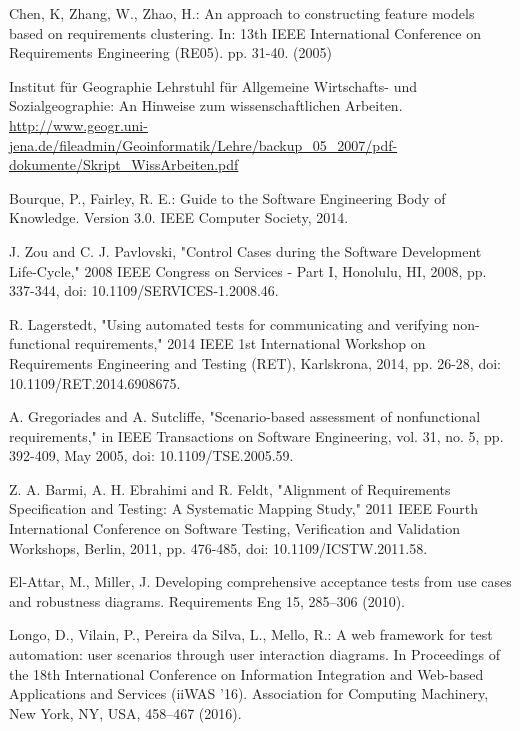 \documentclass[a4paper,10pt, bibliography=totocnumbered]{scrreprt}
\begin{document}
\begin{thebibliography}{9}

 Chen, K, Zhang, W., Zhao, H.: An approach to constructing feature models based on requirements clustering.
In: 13th IEEE International Conference on Requirements Engineering (RE05). pp. 31-40. (2005)

 Institut für Geographie   
Lehrstuhl für Allgemeine Wirtschafts- und Sozialgeographie: An Hinweise zum wissenschaftlichen Arbeiten.
\url{http://www.geogr.uni-jena.de/fileadmin/Geoinformatik/Lehre/backup_05_2007/pdf-dokumente/Skript_WissArbeiten.pdf}

 Bourque, P., Fairley, R. E.: Guide to the Software Engineering Body of Knowledge. Version 3.0.
IEEE Computer Society, 2014.

 J. Zou and C. J. Pavlovski, "Control Cases during the Software Development Life-Cycle," 2008 IEEE Congress on Services - Part I, Honolulu, HI, 2008, pp. 337-344, doi: 10.1109/SERVICES-1.2008.46.

 R. Lagerstedt, "Using automated tests for communicating and verifying non-functional requirements," 2014 IEEE 1st International Workshop on Requirements Engineering and Testing (RET), Karlskrona, 2014, pp. 26-28, doi: 10.1109/RET.2014.6908675.

 A. Gregoriades and A. Sutcliffe, "Scenario-based assessment of nonfunctional requirements," in IEEE Transactions on Software Engineering, vol. 31, no. 5, pp. 392-409, May 2005, doi: 10.1109/TSE.2005.59.

 Z. A. Barmi, A. H. Ebrahimi and R. Feldt, "Alignment of Requirements Specification and Testing: A Systematic Mapping Study," 2011 IEEE Fourth International Conference on Software Testing, Verification and Validation Workshops, Berlin, 2011, pp. 476-485, doi: 10.1109/ICSTW.2011.58.

 El-Attar, M., Miller, J. Developing comprehensive acceptance tests from use cases and robustness diagrams. Requirements Eng 15, 285–306 (2010).

 Longo, D., Vilain, P., Pereira da Silva, L., Mello, R.: A web framework for test automation: user scenarios through user interaction diagrams. In Proceedings of the 18th International Conference on Information Integration and Web-based Applications and Services (iiWAS '16). Association for Computing Machinery, New York, NY, USA, 458–467 (2016). 


\end{thebibliography}
\end{document}

